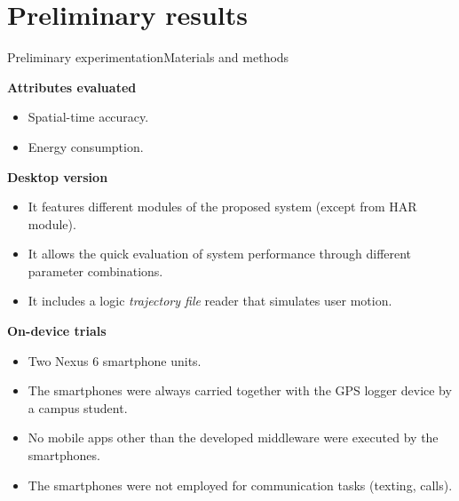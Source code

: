 \section{Preliminary results}
\begin{frame}{Preliminary experimentation}{Materials and methods}
\small
\begin{block}{\small \textbf{Attributes evaluated}}
  \begin{itemize}
    \item Spatial-time accuracy.
    \item Energy consumption.
  \end{itemize}
\end{block}

\begin{block}{\small \textbf{Desktop version}}
  \begin{itemize}
    \item It features different modules of the proposed system (except from HAR module).
    \item It allows the quick evaluation of system performance through different parameter combinations.
    \item It includes a logic \emph{trajectory file} reader that simulates user motion.
  \end{itemize}
\end{block}

\begin{block}{\small \textbf{On-device trials}}
\begin{itemize}
  \item Two Nexus 6 smartphone units.%
  \item The smartphones were always carried together with the GPS logger device by a campus student.
  \item No mobile apps other than the developed middleware were executed by the smartphones.
  \item The smartphones were not employed for communication tasks (texting, calls).
\end{itemize}
\end{block}
\end{frame}

